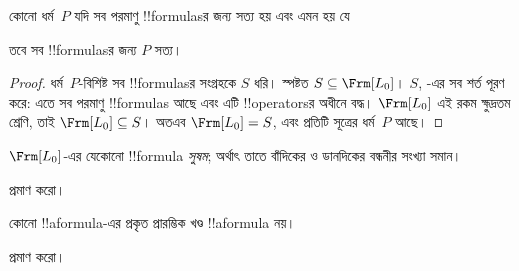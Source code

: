 \documentclass[../../../include/open-logic-section]{subfiles}
\begin{document}


\begin{thm}
  কোনো ধর্ম~$P$ যদি সব পরমাণু !!{formula}sর জন্য সত্য হয় এবং
  এমন হয় যে
  \begin{enumerate}
  \end{enumerate}
  তবে সব !!{formula}sর জন্য $P$ সত্য।
\end{thm}

\begin{proof}
  ধর্ম~$P$-বিশিষ্ট সব !!{formula}sর সংগ্রহকে $S$ ধরি।
  স্পষ্টত $S \subseteq \Frm[L_0]$। $S$,
  -এর সব শর্ত পূরণ করে: এতে সব পরমাণু
  !!{formula}s আছে এবং এটি !!{operator}sর অধীনে বদ্ধ।
  $\Frm[L_0]$ এই রকম ক্ষুদ্রতম শ্রেণি, তাই $\Frm[L_0] \subseteq S$।
  অতএব $\Frm[L_0] = S$, এবং প্রতিটি সূত্রের ধর্ম~$P$ আছে।
\end{proof}

\begin{prop}
   $\Frm[L_0]$-এর যেকোনো !!{formula} \emph{সুষম}; অর্থাৎ তাতে
   বাঁদিকের ও ডানদিকের বন্ধনীর সংখ্যা সমান।
\end{prop}

\begin{prob}
 প্রমাণ করো।
\end{prob}

\begin{prop} 
কোনো !!a{formula}-এর প্রকৃত প্রারম্ভিক খণ্ড !!a{formula} নয়।
\end{prop}

\begin{prob}
   প্রমাণ করো।
\end{prob}
\end{document}
